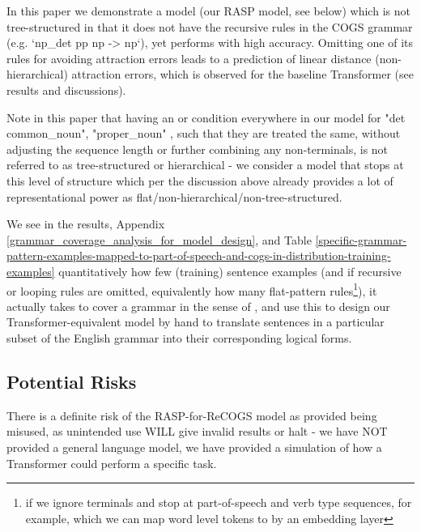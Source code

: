 \documentclass[11pt]{article}
\begin{document}
{\begin{footnotesize}
In this paper we demonstrate a model (our RASP model, see below) which is not tree-structured in that it does not have the recursive rules in the COGS grammar (e.g. `np\_det pp np -> np`), yet performs with high accuracy. Omitting one of its rules for avoiding attraction errors leads to a prediction of linear distance (non-hierarchical) attraction errors, which is observed for the baseline \citep{Wu2023} Transformer (see results and discussions).
\end{footnotesize}
}

Note in this paper that having an or condition everywhere in our model for "det common\_noun", "proper\_noun" , such that they are treated the same, without adjusting the sequence length or further combining any non-terminals, is not referred to as tree-structured or hierarchical - we consider a model that stops at this level of structure which per the discussion above already provides a lot of representational power as flat/non-hierarchical/non-tree-structured.

We see in the results, Appendix \ref{grammar_coverage_analysis_for_model_design}, and Table \ref{specific-grammar-pattern-examples-mapped-to-part-of-speech-and-cogs-in-distribution-training-examples}  quantitatively how few (training) sentence examples (and if recursive or looping rules are omitted, equivalently how many flat-pattern rules\footnote{if we ignore terminals and stop at part-of-speech and verb type sequences, for example, which we can map word level tokens to by an embedding layer}), it actually takes to cover a grammar in the sense of \citep{fuzzingbook2023:GrammarCoverageFuzzer}, and use this to design our Transformer-equivalent model by hand to translate sentences in a particular subset of the English grammar into their corresponding logical forms.

\subsection{Potential Risks}
\label{potential_risks}

There is a definite risk of the RASP-for-ReCOGS model as provided being misused, as unintended use WILL give invalid results or halt - we have NOT provided a general language model, we have provided a simulation of how a Transformer could perform a specific task.
\end{document}
